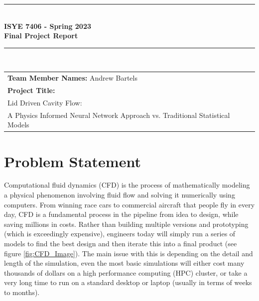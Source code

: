 \documentclass{article}
\begin{document}
	\begin{titlepage}
		\clearpage\thispagestyle{empty}
		\centering
		\vspace{1cm}
		
		\rule{\linewidth}{1mm} \\[0.5cm]
		{ \Large \bfseries ISYE 7406 - Spring 2023\\[0.2cm]
			Final Project Report}\\[0.5cm]
		\rule{\linewidth}{1mm} \\[1cm]
		
		\begin{tabular}{l p{5cm}}
			\textbf{Team Member Names:} Andrew Bartels&   \\[10pt]
			\textbf{Project Title:} \\ Lid Driven Cavity Flow: \\
			A Physics Informed Neural Network Approach vs. Traditional Statistical Models &  \\[10pt]
			
		\end{tabular} 
	\end{titlepage}
	
	\tableofcontents
	\clearpage
	\thispagestyle{empty}
    \listoffigures
    \newpage

	\section{Problem Statement}
	
	\indent Computational fluid dynamics (CFD) is the process of mathematically modeling a physical phenomenon involving fluid flow and solving it numerically using computers\cite{SimScale}. From winning race cars to commercial aircraft that people fly in every day, CFD is a fundamental process in the pipeline from idea to design, while saving millions in costs. Rather than building multiple versions and prototyping (which is exceedingly expensive), engineers today will simply run a series of models to find the best design and then iterate this into a final product (see figure \ref{fig:CFD_Image}). The main issue with this is depending on the detail and length of the simulation, even the most basic simulations will either cost many thousands of dollars on a high performance computing (HPC) cluster, or take a very long time to run on a standard desktop or laptop (usually in terms of weeks to months).
	
\end{document}
